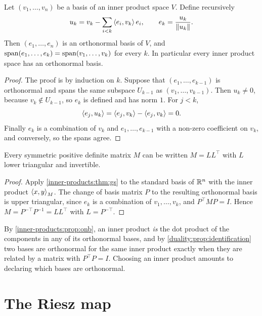 \begin{notechapter}
\begin{theorem}\label{inner-products:thm:gs}
Let $(v_1,\dots,v_n)$ be a basis of an inner product space $V$. Define
recursively
\[
  u_k = v_k - \sum_{i<k}\left\langle e_i, v_k \right\rangle e_i ,
  \qquad
  e_k = \frac{u_k}{\left\|u_k\right\|} .
\]
Then $(e_1,\dots,e_n)$ is an orthonormal basis of $V$, and
$\operatorname{span}(e_1,\dots,e_k) = \operatorname{span}(v_1,\dots,v_k)$ for every $k$. In particular
every inner product space has an orthonormal basis.
\end{theorem}

\begin{proof}
The proof is by induction on $k$. Suppose that $(e_1,\dots,e_{k-1})$ is
orthonormal and spans the same subspace $U_{k-1}$ as
$(v_1,\dots,v_{k-1})$. Then $u_k\neq0$, because $v_k\notin U_{k-1}$, so
$e_k$ is defined and has norm $1$. For $j < k$,
\[
  \left\langle e_j, u_k \right\rangle = \left\langle e_j, v_k \right\rangle - \left\langle e_j, v_k \right\rangle = 0 .
\]
Finally
$e_k$ is a combination of $v_k$ and $e_1,\dots,e_{k-1}$ with a non-zero
coefficient on $v_k$, and conversely, so the spans agree.
\end{proof}

\begin{corollary}\label{inner-products:cor:cholesky}
Every symmetric positive definite matrix $M$ can be written $M = LL^\top$
with $L$ lower triangular and invertible.
\end{corollary}

\begin{proof}
Apply \cref{inner-products:thm:gs} to the standard basis of $\mathbb{R}^n$ with the
inner product $\left\langle x, y \right\rangle_M$. The change of basis matrix $P$ to the
resulting orthonormal basis is upper triangular, since $e_k$ is a
combination of $v_1,\dots,v_k$, and $P^\top MP = I$. Hence
$M = P^{-\top}P^{-1} = LL^\top$ with $L = P^{-\top}$.
\end{proof}

\begin{keyidea}
By \cref{inner-products:prop:onb}, an inner product \emph{is} the dot
product of the components in any of its orthonormal bases, and by
\cref{duality:prop:identification} two bases are orthonormal for the same
inner product exactly when they are related by a matrix with
$P^\top P = I$. Choosing an inner product amounts to declaring which bases
are orthonormal.
\end{keyidea}

\section{The Riesz map}\label{inner-products:sec:riesz}


\end{notechapter}
